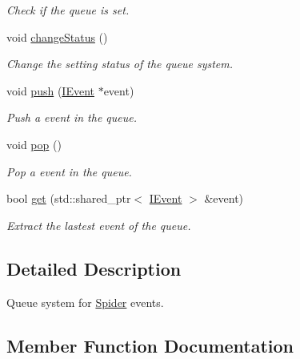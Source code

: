 \begin{DoxyCompactItemize}
\begin{DoxyCompactList}\small\item\em Check if the queue is set. \end{DoxyCompactList}\item 
\mbox{\label{class_spider_1_1_event_1_1_event_queue_acabae5a89986f14ba821bb0f8a1fc0eb}} 
void \hyperlink{class_spider_1_1_event_1_1_event_queue_acabae5a89986f14ba821bb0f8a1fc0eb}{change\+Status} ()
\begin{DoxyCompactList}\small\item\em Change the setting status of the queue system. \end{DoxyCompactList}\item 
void \hyperlink{class_spider_1_1_event_1_1_event_queue_a978f4bd1835a93fccee1d8b04a547509}{push} (\hyperlink{class_spider_1_1_event_1_1_i_event}{I\+Event} $\ast$event)
\begin{DoxyCompactList}\small\item\em Push a event in the queue. \end{DoxyCompactList}\item 
void \hyperlink{class_spider_1_1_event_1_1_event_queue_a6946c1cc04ef2b83aaa84f70d1721a30}{pop} ()
\begin{DoxyCompactList}\small\item\em Pop a event in the queue. \end{DoxyCompactList}\item 
bool \hyperlink{class_spider_1_1_event_1_1_event_queue_a3e14657755e1b44465008a73430b0b64}{get} (std\+::shared\+\_\+ptr$<$ \hyperlink{class_spider_1_1_event_1_1_i_event}{I\+Event} $>$ \&event)
\begin{DoxyCompactList}\small\item\em Extract the lastest event of the queue. \end{DoxyCompactList}\end{DoxyCompactItemize}


\subsection{Detailed Description}
Queue system for \hyperlink{namespace_spider}{Spider} events. 

\subsection{Member Function Documentation}
\mbox{\label{class_spider_1_1_event_1_1_event_queue_a3e14657755e1b44465008a73430b0b64}} 
